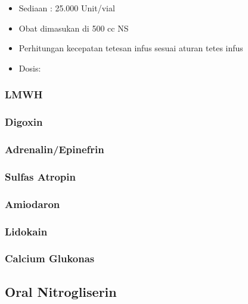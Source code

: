 \documentclass[
]{book}
\providecommand{\tightlist}{%
  \setlength{\itemsep}{0pt}\setlength{\parskip}{0pt}}
\begin{document}
\begin{itemize}
\tightlist
\item
  Sediaan : 25.000 Unit/vial
\item
  Obat dimasukan di 500 cc NS
\item
  Perhitungan kecepatan tetesan infus sesuai aturan tetes infus
\item
  Dosis:
\end{itemize}

\hypertarget{lmwh}{%
\subsubsection{LMWH}\label{lmwh}}

\hypertarget{digoxin}{%
\subsubsection{Digoxin}\label{digoxin}}

\hypertarget{adrenalinepinefrin}{%
\subsubsection{Adrenalin/Epinefrin}\label{adrenalinepinefrin}}

\hypertarget{sulfas-atropin}{%
\subsubsection{Sulfas Atropin}\label{sulfas-atropin}}

\hypertarget{amiodaron}{%
\subsubsection{Amiodaron}\label{amiodaron}}

\hypertarget{lidokain}{%
\subsubsection{Lidokain}\label{lidokain}}

\hypertarget{calcium-glukonas}{%
\subsubsection{Calcium Glukonas}\label{calcium-glukonas}}

\hypertarget{oral-nitrogliserin}{%
\subsection{Oral Nitrogliserin}\label{oral-nitrogliserin}}
\end{document}

